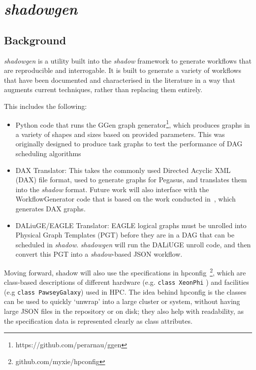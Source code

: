 \documentclass[a4paper,11pt]{article}
\begin{document}
\section*{\textit{shadowgen}}
\label{sec:shadowgen}
\subsection*{Background}
\label{sec:background}

\textit{shadowgen} is a utility built into the \textit{shadow} framework to
generate workflows that are reproducible and interrogable. It is built to
generate a variety of workflows that have been documented and characterised in
the literature in a way that augments current techniques, rather than
replacing them entirely. 

This includes the following: 

\begin{itemize}
	\item Python code that runs the GGen graph
	generator\footnote{https://github.com/perarnau/ggen}, which produces graphs in a variety of shapes and sizes based on provided parameters. This was originally designed to produce task graphs to test the performance of DAG scheduling algorithms
	\item DAX Translator: This takes the commonly used Directed Acyclic XML (DAX)
	file format, used to generate graphs for Pegasus, and translates them into
	the \textit{shadow} format. Future work will also interface with the
	WorkflowGenerator code that is based on the work conducted
	in~\cite{bharathi2008}, which generates DAX graphs. 
	\item DALiuGE/EAGLE Translator: EAGLE logical graphs must be unrolled into
	Physical Graph Templates (PGT) before they are in a DAG that can be scheduled in
	\textit{shadow}. \textit{shadowgen} will run the DALiUGE unroll code, and then
	convert this PGT into a \textit{shadow}-based JSON workflow. 
\end{itemize}

Moving forward, shadow will also use the specifications in
hpconfig~\footnote{github.com/myxie/hpconfig}, which are class-based
descriptions of different hardware (e.g. \texttt{class XeonPhi} ) and
facilities (e.g \texttt{class PawseyGalaxy}) used in HPC. The idea behind hpconfig is
the classes can be used to quickly `unwrap' into a large cluster or system,
without having large JSON files in the repository or on disk; they also help
with readability, as the specification data is represented clearly as class
attributes. 
\end{document}
